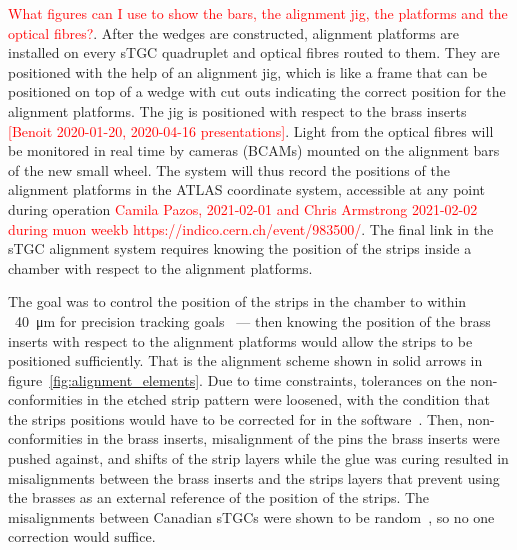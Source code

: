 \textcolor{red}{What figures can I use to show the bars, the alignment jig, the platforms and the optical fibres?}.
After the wedges are constructed, alignment platforms are installed on every sTGC quadruplet and optical fibres routed to them. They are positioned with the help of an alignment jig, which is like a frame that can be positioned on top of a wedge with cut outs indicating the correct position for the alignment platforms. The jig is positioned with respect to the brass inserts \textcolor{red}{[Benoit 2020-01-20, 2020-04-16 presentations]}.  Light from the optical fibres will be monitored in real time by cameras (BCAMs) mounted on the alignment bars of the new small wheel. The system will thus record the positions of the alignment platforms in the ATLAS coordinate system, accessible at any point during operation \textcolor{red}{Camila Pazos, 2021-02-01 and Chris Armstrong 2021-02-02 during muon weekb https://indico.cern.ch/event/983500/}. The final link in the sTGC alignment system requires knowing the position of the strips inside a chamber with respect to the alignment platforms.

The goal was to control the position of the strips in the chamber to within ~\SI{40}{\micro\meter} for precision tracking goals~\cite{nsw_tdr} --- then knowing the position of the brass inserts with respect to the alignment platforms would allow the strips to be positioned sufficiently. That is the alignment scheme shown in solid arrows in figure~\ref{fig:alignment_elements}. Due to time constraints, tolerances on the non-conformities in the etched strip pattern were loosened, with the condition that the strips positions would have to be corrected for in the software~\cite{carlson_results_2019}. Then, non-conformities in the brass inserts, misalignment of the pins the brass inserts were pushed against, and shifts of the strip layers while the glue was curing resulted in misalignments between the brass inserts and the strips layers that prevent using the brasses as an external reference of the position of the strips. The misalignments between Canadian sTGCs were shown to be random~\cite{carlson_results_2019}, so no one correction would suffice.

